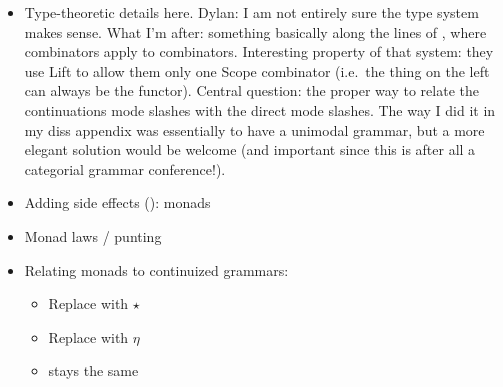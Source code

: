 \begin{itemize}
\begin{figure*}
{\[\begin{array}{c}
\begin{array}{c@{\hspace{2em}}c@{\hspace{2em}}c@{\hspace{2em}}c}
			\pruf{%
			\AXC{$\Gamma \vdash f : b/a~~$}
			\AXC{$~~\Delta \vdash e : a$}
			\lab{$/$}
			\BIC{$\Gamma \cdot \Delta \vdash f\,e : b$}
			}
			&
			\pruf{%
			\AXC{$\Delta \vdash e : a~~$}
			\AXC{$~~\Gamma \vdash f : a \backslash b$}
			\lab{$\backslash$}
			\BIC{$\Delta \cdot \Gamma \vdash f\,e : b$}
			}
			&
			\pruf{%
			\AXC{$\Delta \vdash m : \textsf{K}\,(b/a)\,r~~$}
			\AXC{$~~\Gamma \vdash n : \textsf{K}\,a\,r$}
			\lab{$\sslash$}
			\BIC{$\Delta \cdot \Gamma \vdash \bsf{S}\,m\,n : \textsf{K}\,b\,r$}
			}
		\end{array}
		\\\\
		\begin{array}{c@{\hspace{2em}}c}
				\pruf{%
				\AXC{}
				\lab{\bsf{triv}}
				\UIC{$\varepsilon \vdash \eta : a \ra \textsf{M}\,a$}
				}
				&
				\pruf{%
				\AXC{}
				\lab{\bsf{lift}}
				\UIC{$\varepsilon \vdash (\star) :  \textsf{M}\,a \ra \textsf{K}\,a\,\textsf{M}\,r$}%
				}
		\end{array}
		\\[-1em]
		\end{array}\]}
		\caption{Continuized CCG with side effects (fixing a monad  and a result type $r$).}%
		\label{fig2}
	\end{figure*}
	\item Type-theoretic details here. Dylan: I am not entirely sure the type system makes sense. What I'm after: something basically along the lines of \citealt{ShanBarker:2006}, where combinators apply to combinators. Interesting property of that system: they use Lift to allow them only one Scope combinator (i.e.~the thing on the left can always be the functor). Central question: the proper way to relate the continuations mode slashes with the direct mode slashes. The way I did it in my diss appendix was essentially to have a unimodal grammar, but a more elegant solution would be welcome (and important since this is after all a categorial grammar conference!). %
	
	\item Adding side effects (\citealt{Wadler:1994, Wadler:1995, Shan:2002}): monads%
	
	\item Monad laws / punting
	
	\item Relating monads to continuized grammars:
	\begin{itemize}
		\item Replace  with $\star$
		\item Replace  with $\eta$
		\item {} stays the same
	\end{itemize}
	
\end{itemize}

